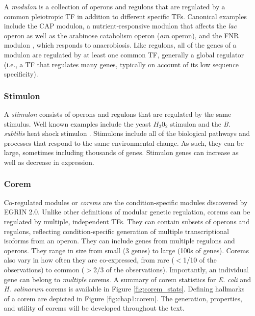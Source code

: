 A \textit{modulon} is a collection of operons and regulons that are regulated by a common pleiotropic TF in addition to different specific TFs. Canonical examples include the CAP modulon, a nutrient-responsive modulon that affects the \textit{lac} operon as well as the arabinose catabolism operon (\textit{ara} operon), and the FNR modulon \cite{guest_fnr_1996}, which responds to anaerobiosis. Like regulons, all of the genes of a modulon are regulated by at least one common TF, generally a global regulator (i.e., a TF that regulates many genes, typically on account of its low sequence specificity). 

\subsubsection{Stimulon}

A \textit{stimulon} consists of operons and regulons that are regulated by the same stimulus. Well known examples include the yeast $H_{2}0_{2}$ stimulon \cite{godon_h2o2_1998} and the \textit{B. subtilis} heat shock stimulon \cite{schumann_bacillus_2003}. Stimulons include all of the biological pathways and processes that respond to the same environmental change. As such, they can be large, sometimes including thousands of genes. Stimulon genes can increase as well as decrease in expression.

\subsubsection{Corem}

Co-regulated modules or \textit{corems} are the condition-specific modules discovered by EGRIN 2.0. Unlike other definitions of modular genetic regulation, corems can be regulated by multiple, independent TFs. They can contain subsets of operons and regulons, reflecting condition-specific generation of multiple transcriptional isoforms from an operon. They can include genes from multiple regulons and operons. They range in size from small (3 genes) to large (100s of genes). Corems also vary in how often they are co-expressed, from rare ($<$1/10 of the observations) to common ($>$2/3 of the observations). Importantly, an individual gene can belong to \textit{multiple} corems. A summary of corem statistics for \textit{E. coli} and \textit{H. salinarum} corems is available in Figure \ref{fig:corem_stats}. Defining hallmarks of a corem are depicted in Figure \ref{fig:chap1:corem}. The generation, properties, and utility of corems will be developed throughout the text.


